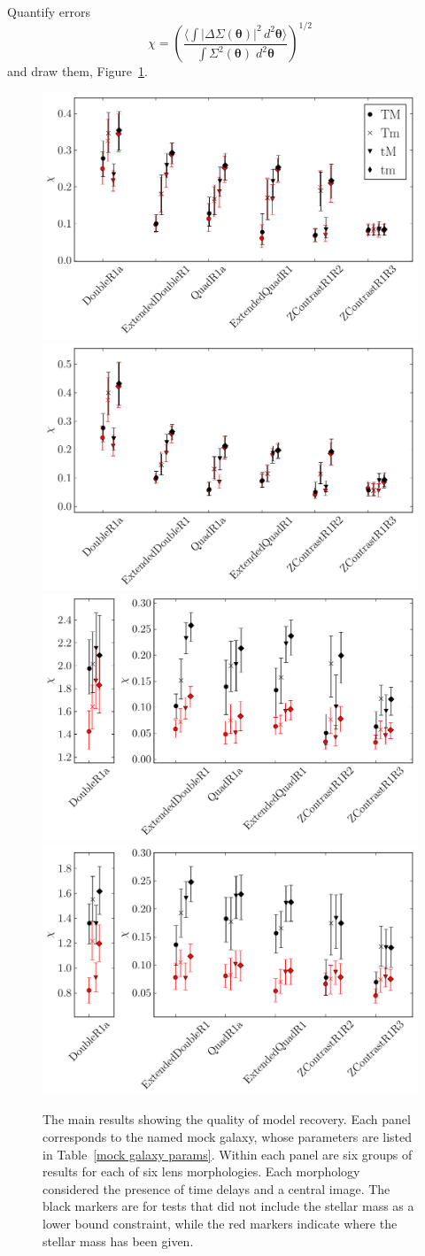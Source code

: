 \documentclass[usenatbib,onecolumn,galley]{mn2e}
\newcommand{\tabref}[1] {Table~\ref{#1}}
\newcommand{\figref}[1] {Figure~\ref{#1}}
\renewcommand{\vec}[1]{\ensuremath{\boldsymbol{#1}}}
\begin{document}
Quantify errors
\begin{equation}
\chi = \left(\frac
       {\Big\langle \int \left|\Delta\Sigma(\vec{\theta})\right|^2 \,
        d^2 \vec{\theta} \Big\rangle}
       {\int \Sigma^2(\vec{\theta}) \; d^2 \vec{\theta}}
       \right)^{1/2}
\end{equation}
and draw them, \figref{main results}.


\begin{figure}
\begin{center}
\includegraphics[width=.4\columnwidth]{AAchi2_profile.pdf}\hfil
\includegraphics[width=.4\columnwidth]{BBchi2_profile.pdf}
\includegraphics[width=.4\columnwidth]{ACchi2_profile.pdf}\hfil
\includegraphics[width=.4\columnwidth]{BCchi2_profile.pdf}
\end{center}
\caption{The main results showing the quality of model recovery. Each
  panel corresponds to the named mock galaxy, whose parameters are
  listed in \tabref{mock galaxy params}. Within each panel are six
  groups of results for each of six lens morphologies. Each morphology
  considered the presence of time delays and a central image. The
  black markers are for tests that did not include the stellar mass as
  a lower bound constraint, while the red markers indicate where the
  stellar mass has been given.}
\label{main results}
\end{figure}
\end{document}
